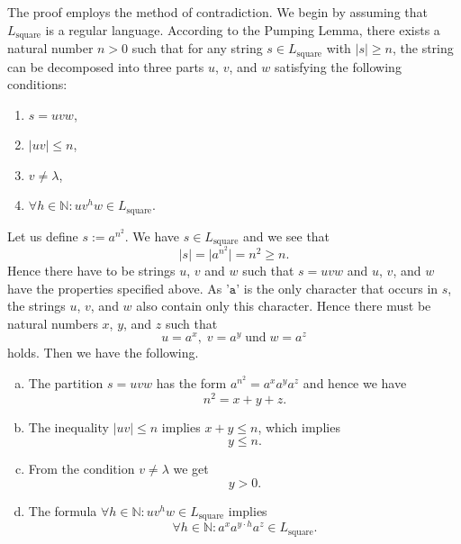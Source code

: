 \solutionEng
The proof employs the method of contradiction. We begin by assuming that $L_{\mathrm{square}}$ is a regular
language. According to the Pumping Lemma, there exists a natural number $n > 0$ such that for any string
$s \in L_{\mathrm{square}}$ with $|s| \geq n$, the string can be decomposed into three parts $u$, $v$, and $w$ 
satisfying the following conditions:  
\begin{enumerate}
\item $s = uvw$,
\item $|uv| \leq n$,
\item $v \not= \lambda$,
\item $\forall h \in \mathbb{N}: uv^hw \in L_{\mathrm{square}}$. 
\end{enumerate} 
Let us define $s := a^{n^2}$.  We have $s \in L_{\mathrm{square}}$ and we see that
\[ |s| = \big| a^{n^2} \big| = n^2 \geq n. \]
Hence there have to be strings $u$, $v$ and $w$ such that $s = uvw$ and $u$, $v$, and $w$ have
the properties specified above.
As '$\mathtt{a}$' is the only character that occurs in $s$, the strings $u$, $v$, and $w$ also contain only this character.
Hence there must be natural numbers $x$, $y$, and $z$ such that 
\[ u = a^x,\; v = a^y\; \mbox{und}\; w = a^z \]
holds.  Then we have the following.
\begin{enumerate}[(a)]
\item The partition  $s = uvw$ has the form $a^{n^2} = a^xa^ya^z$ and hence we have
      \begin{equation}
        \label{eq:e1}
         n^2 = x + y + z.     
      \end{equation}
\item The inequality $|uv| \leq n$ implies $x +y \leq n$, which implies
      \begin{equation}
        \label{eq:e2}
        y \leq n.
      \end{equation}
\item From the condition $v \not= \lambda$ we get
      \begin{equation}
        \label{eq:e3}
        y > 0.
      \end{equation}
\item The formula $\forall h \in \mathbb{N}: uv^hw \in L_{\mathrm{square}}$ implies
      \begin{equation}
        \label{eq:e4}
        \forall h \in \mathbb{N}: a^xa^{y\cdot h}a^z \in L_{\mathrm{square}}. 
      \end{equation}
\end{enumerate}
